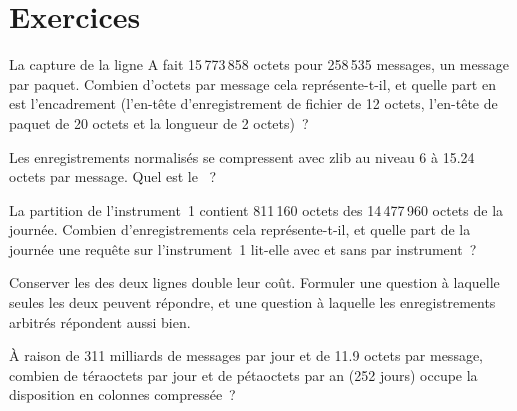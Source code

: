 \section{Exercices}

\begin{exercise}[$\star$]\label{exo:pl:capturing-and-storing-tick-data:1}
La capture de la ligne A fait 15\,773\,858 octets pour 258\,535 messages, un message par paquet. Combien d'octets par message cela représente-t-il, et
quelle part en est l'encadrement (l'en-tête d'enregistrement de fichier de 12 octets, l'en-tête de paquet de 20 octets et la longueur de 2 octets)~?
\end{exercise}

\begin{exercise}[$\star$]\label{exo:pl:capturing-and-storing-tick-data:2}
Les enregistrements normalisés se compressent avec zlib au niveau 6 à 15.24 octets par message. Quel est le ~?
\end{exercise}

\begin{exercise}[$\star$]\label{exo:pl:capturing-and-storing-tick-data:3}
La partition de l'instrument~1 contient 811\,160 octets des 14\,477\,960 octets de la journée. Combien d'enregistrements cela représente-t-il, et quelle part de la journée
une requête sur l'instrument~1 lit-elle avec et sans  par instrument~?
\end{exercise}

\begin{exercise}[$\star\star$]\label{exo:pl:capturing-and-storing-tick-data:4}
Conserver les  des deux lignes double leur coût. Formuler une question à laquelle seules les deux  peuvent répondre, et une question
à laquelle les enregistrements arbitrés répondent aussi bien.
\end{exercise}

\begin{exercise}[$\star\star$]\label{exo:pl:capturing-and-storing-tick-data:5}
À raison de 311 milliards de messages par jour et de 11.9 octets par message, combien de téraoctets par jour et de pétaoctets par an (252 jours)
occupe la disposition en colonnes compressée~?
\end{exercise}

